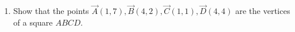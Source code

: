 \documentclass{article}
\begin{document}
\begin{enumerate}
		
			


\item Show that the points $\vec{A}(1,7), \vec{B}(4,2), \vec{C}(1,1), \vec{D}(4,4)$ are the vertices of a square $ABCD$. 





\end{enumerate}
\end{document}
